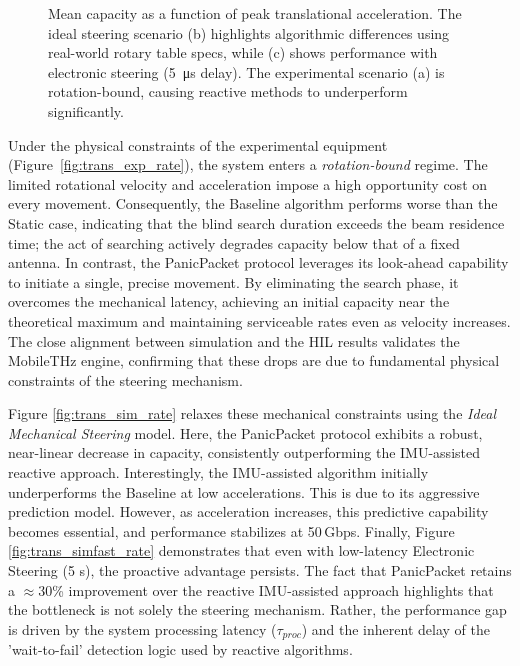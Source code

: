 \documentclass[fleqn,10pt]{wlscirep}
\newcommand{\legmark}[2]{%
    \tikz[baseline=-0.5ex]{
        \node[#2, fill=#1, draw=#1, inner sep=2pt, scale=0.8] at (0,0) {};
    }%
}
\begin{document}
\begin{figure}[ht!]
    
    \caption{Mean capacity as a function of peak translational acceleration. The ideal steering scenario (b) highlights algorithmic differences using real-world rotary table specs, while (c) shows performance with electronic steering (\SI{5}{\micro\second} delay). The experimental scenario (a) is rotation-bound, causing reactive methods to underperform significantly.}
    \label{fig:translational_rate}
\end{figure}

Under the physical constraints of the experimental equipment (Figure~\ref{fig:trans_exp_rate}), the system enters a \textit{rotation-bound} regime. The limited rotational velocity and acceleration impose a high opportunity cost on every movement. Consequently, the Baseline algorithm performs worse than the Static case, indicating that the blind search duration exceeds the beam residence time; the act of searching actively degrades capacity below that of a fixed antenna. In contrast, the PanicPacket protocol leverages its look-ahead capability to initiate a single, precise movement. By eliminating the search phase, it overcomes the mechanical latency, achieving an initial capacity near the theoretical maximum and maintaining serviceable rates even as velocity increases. The close alignment between simulation and the HIL results validates the MobileTHz engine, confirming that these drops are due to fundamental physical constraints of the steering mechanism.

Figure \ref{fig:trans_sim_rate} relaxes these mechanical constraints using the \textit{Ideal Mechanical Steering} model. Here, the PanicPacket protocol exhibits a robust, near-linear decrease in capacity, consistently outperforming the IMU-assisted reactive approach. Interestingly, the IMU-assisted algorithm initially underperforms the Baseline at low accelerations. This is due to its aggressive prediction model. However, as acceleration increases, this predictive capability becomes essential, and performance stabilizes at 50\,Gbps. Finally, Figure \ref{fig:trans_simfast_rate} demonstrates that even with low-latency Electronic Steering (5 \textmu s), the proactive advantage persists. The fact that PanicPacket retains a $\approx$30\% improvement over the reactive IMU-assisted approach highlights that the bottleneck is not solely the steering mechanism. Rather, the performance gap is driven by the system processing latency ($\tau_{proc}$) and the inherent delay of the 'wait-to-fail' detection logic used by reactive algorithms.
\end{document}
